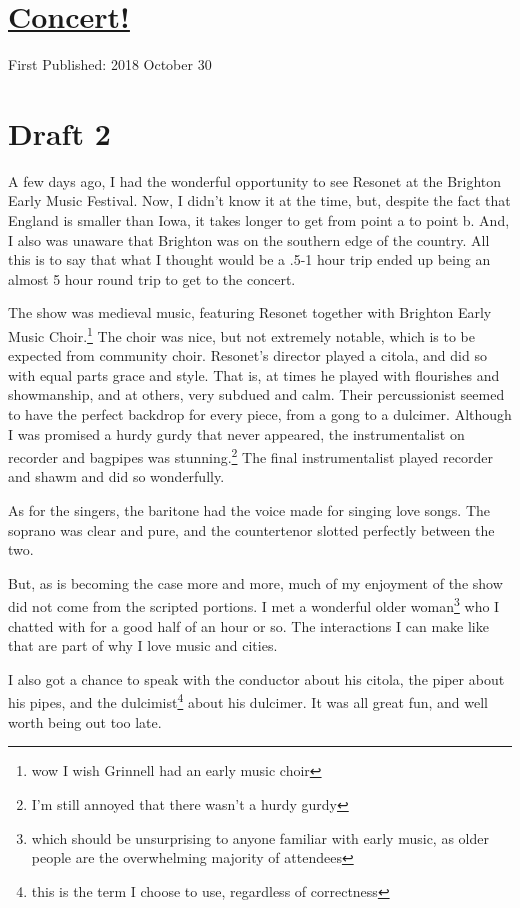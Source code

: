 \documentclass[12pt]{article}[titlepage]
\newcommand{\1}{\={a}}
\newcommand{\2}{\={e}}
\newcommand{\3}{\={\i}}
\newcommand{\4}{\=o}
\newcommand{\5}{\=u}
\newcommand{\6}{\={A}}
\renewcommand{\,}{\textsuperscript{,}}
\begin{document}
\doublespacing
\section{\href{concert.html}{Concert!}}
First Published: 2018 October 30
\section{Draft 2}
A few days ago, I had the wonderful opportunity to see Resonet at the Brighton Early Music Festival.
Now, I didn't know it at the time, but, despite the fact that England is smaller than Iowa, it takes longer to get from point a to point b.
And, I also was unaware that Brighton was on the southern edge of the country.
All this is to say that what I thought would be a .5-1 hour trip ended up being an almost 5 hour round trip to get to the concert.

The show was medieval music, featuring Resonet together with Brighton Early Music Choir.\footnote{wow I wish Grinnell had an early music choir}
The choir was nice, but not extremely notable, which is to be expected from community choir.
Resonet's director played a citola, and did so with equal parts grace and style.
That is, at times he played with flourishes and showmanship, and at others, very subdued and calm.
Their percussionist seemed to have the perfect backdrop for every piece, from a gong to a dulcimer.
Although I was promised a hurdy gurdy that never appeared, the instrumentalist on recorder and bagpipes was stunning.\footnote{I'm still annoyed that there wasn't a hurdy gurdy}
The final instrumentalist played recorder and shawm and did so wonderfully.

As for the singers, the baritone had the voice made for singing love songs.
The soprano was clear and pure, and the countertenor slotted perfectly between the two.

But, as is becoming the case more and more, much of my enjoyment of the show did not come from the scripted portions.
I met a wonderful older woman\footnote{which should be unsurprising to anyone familiar with early music, as older people are the overwhelming majority of attendees} who I chatted with for a good half of an hour or so.
The interactions I can make like that are part of why I love music and cities.

I also got a chance to speak with the conductor about his citola, the piper about his pipes, and the dulcimist\footnote{this is the term I choose to use, regardless of correctness} about his dulcimer.
It was all great fun, and well worth being out too late.
\end{document}
